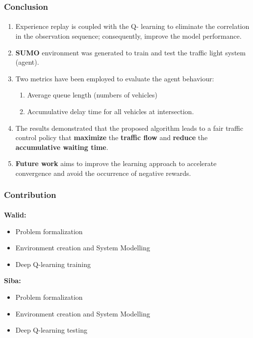 \documentclass[aspectratio=169]{beamer}
\begin{document}
\begin{frame}
\frametitle{Conclusion}
\framesubtitle{}
\begin{enumerate}
    \item Experience replay is coupled with the Q- learning to eliminate the correlation in the observation sequence; consequently, improve the model performance.
    \item \textbf{SUMO} environment was generated to train and test the traffic light system (agent).
    \item Two metrics have been employed to evaluate the agent behaviour: 
    \begin{enumerate}
    \item Average queue length (numbers of vehicles)
    \item Accumulative delay time for all vehicles at intersection. 
    \end{enumerate}
    \item The results demonstrated that the proposed algorithm leads to a fair traffic control policy that \textbf{maximize} the \textbf{traffic flow }and \textbf{reduce} the \textbf{accumulative waiting time}.
    \item \textbf{Future work} aims to improve the learning approach to
accelerate convergence and avoid the occurrence of negative
rewards.
\end{enumerate}


\end{frame}

\begin{frame}
\frametitle{Contribution}
\framesubtitle{}
\vspace{1cm}
\begin{minipage}{0.5\textwidth}
\textbf{Walid:}\\
\begin{itemize}
    \item Problem formalization
    \item Environment creation and System Modelling
    \item Deep Q-learning training 
\end{itemize}
\end{minipage}%
\hfill
\begin{minipage}{0.5\textwidth}
\textbf{Siba:}\\
\begin{itemize}
    \item Problem formalization
    \item Environment creation and System Modelling
    \item Deep Q-learning testing 
\end{itemize}
\end{minipage}


\end{frame}
\end{document}

